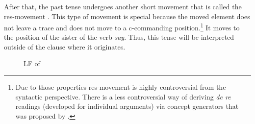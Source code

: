 \documentclass[output=paper,modfonts,newtxmath,hidelinks]{langscibook}
\begin{document}
After that, the past tense undergoes another short movement that is called the res-movement \citep{Heim1994}. This type of movement is special because the moved element does not leave a trace and does not move to a c-commanding position.\footnote{\label{20:fn10}Due to those properties res-movement is highly controversial from the syntactic perspective. There is a less controversial way of deriving \textit{de re} readings (developed for individual arguments) via concept generators that was proposed by \citet{PercusSauerland2003}.} It moves to the position of the sister of the verb \textit{say}. Thus, this tense will be interpreted outside of the clause where it originates.\largerpage[-3]

\begin{figure}
\caption{LF of }\label{20:ex35}
\end{figure}
\end{document}
